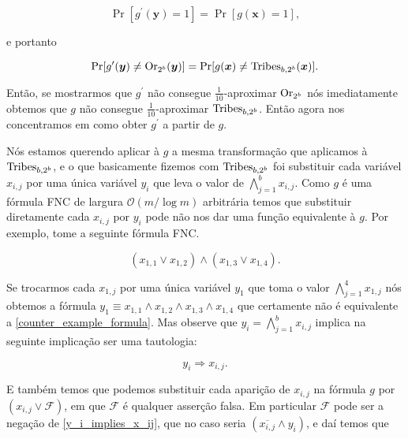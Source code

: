\begin{equation*}
    \Pr[g^{\prime}(\boldsymbol{y}) = 1] = \Pr[g(\boldsymbol{x}) = 1],
\end{equation*}

e portanto

\begin{equation*}
    \Pr[g^{\prime}(\boldsymbol{y}) \neq \text{Or}_{2^{b}}(\boldsymbol{y})] = \Pr[g(\boldsymbol{x}) \neq \text{Tribes}_{b, 2^{b}}(\boldsymbol{x})].
\end{equation*}

Então, se mostrarmos que $g^{\prime}$ não consegue $\frac{1}{10}$-aproximar $\text{Or}_{2^{b}}$ nós imediatamente obtemos que $g$ não consegue $\frac{1}{10}$-aproximar $\text{Tribes}_{b, 2^{b}}$. Então agora nos concentramos em como obter $g^{\prime}$ a partir de $g$.

Nós estamos querendo aplicar à $g$ a mesma transformação que aplicamos à $\text{Tribes}_{b, 2^{b}}$, e o que basicamente fizemos com $\text{Tribes}_{b, 2^{b}}$ foi substituir cada variável $x_{i, j}$ por uma única variável $y_{i}$ que leva o valor de $\bigwedge_{j = 1}^{b} x_{i, j}$. Como $g$ é uma fórmula FNC de largura $\mathcal{O}(m/\log m)$ arbitrária temos que substituir diretamente cada $x_{i, j}$ por $y_{i}$ pode não nos dar uma função equivalente à $g$. Por exemplo, tome a seguinte fórmula FNC.

\begin{equation} \label{counter_example_formula}
    (x_{1, 1} \lor x_{1, 2}) \land (x_{1, 3} \lor x_{1, 4}).
\end{equation}

Se trocarmos cada $x_{1, j}$ por uma única variável $y_{1}$ que toma o valor $\bigwedge_{j = 1}^{4} x_{1, j}$ nós obtemos a fórmula $y_{1} \equiv x_{1, 1} \land x_{1, 2} \land x_{1, 3} \land x_{1, 4}$ que certamente não é equivalente a \ref{counter_example_formula}. Mas observe que $y_{i} = \bigwedge_{j = 1}^{b} x_{i, j}$ implica na seguinte implicação ser uma tautologia:

\begin{equation} \label{y_i_implies_x_ij}
    y_{i} \Rightarrow x_{i, j}.
\end{equation}

E também temos que podemos substituir cada aparição de $x_{i, j}$ na fórmula $g$ por $(x_{i, j} \lor \mathcal{F})$, em que $\mathcal{F}$ é qualquer asserção falsa. Em particular $\mathcal{F}$ pode ser a negação de \ref{y_i_implies_x_ij}, que no caso seria $(\overline{x_{i, j}} \land y_{i})$, e daí temos que


